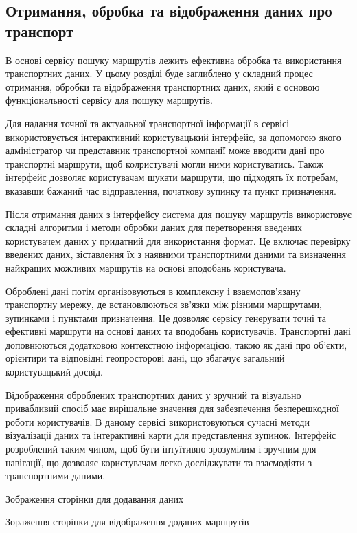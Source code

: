\subsection{Отримання, обробка та відображення даних про транспорт}
\label{subsec:route-management-subsection}

В основі сервісу пошуку маршрутів лежить ефективна обробка та використання транспортних даних. У цьому розділі буде заглиблено у складний процес отримання, обробки та відображення транспортних даних, який є основою функціональності сервісу для пошуку маршрутів. 

Для надання точної та актуальної транспортної інформації в сервісі використовується інтерактивний користувацький інтерфейс, за допомогою якого адміністратор чи представник транспортної компанії може вводити дані про транспортні маршрути, щоб колристувачі могли ними користуватись. Також інтерфейс дозволяє користувачам шукати маршрути, що підходять їх потребам, вказавши бажаний час відправлення, початкову зупинку та пункт призначення.

Після отримання даних з інтерфейсу система для пошуку маршрутів використовує складні алгоритми і методи обробки даних для перетворення введених користувачем даних у придатний для використання формат. Це включає перевірку введених даних, зіставлення їх з наявними транспортними даними та визначення найкращих можливих маршрутів на основі вподобань користувача.

Оброблені дані потім організовуються в комплексну і взаємопов'язану транспортну мережу, де встановлюються зв'язки між різними маршрутами, зупинками і пунктами призначення. Це дозволяє сервісу генерувати точні та ефективні маршрути на основі даних та вподобань користувачів. Транспортні дані доповнюються додатковою контекстною інформацією, такою як дані про об'єкти, орієнтири та відповідні геопросторові дані, що збагачує загальний користувацький досвід.

Відображення оброблених транспортних даних у зручний та візуально привабливий спосіб має вирішальне значення для забезпечення безперешкодної роботи користувачів. В даному сервісі використовуються сучасні методи візуалізації даних та інтерактивні карти для представлення зупинок. Інтерфейс розроблений таким чином, щоб бути інтуїтивно зрозумілим і зручним для навігації, що дозволяє користувачам легко досліджувати та взаємодіяти з транспортними даними.

Зображення сторінки для додавання даних

Зораження сторінки для відображення доданих маршрутів


